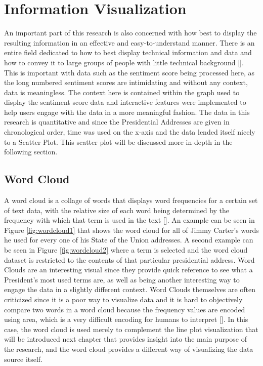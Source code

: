 \section{Information Visualization}
An important part of this research is also concerned with how best to display the resulting information in an effective and easy-to-understand manner.
There is an entire field dedicated to how to best display technical information and data and how to convey it to large groups of people with little technical background [\cite{fekete2008value}].
This is important with data such as the sentiment score being processed here, as the long numbered sentiment scores are intimidating and without any context, data is meaningless.
The context here is contained within the graph used to display the sentiment score data and interactive features were implemented to help users engage with the data in a more meaningful fashion.
The data in this research is quantitative and since the Presidential Addresses are given in chronological order, time was used on the x-axis and the data lended itself nicely to a Scatter Plot.
This scatter plot will be discussed more in-depth in the following section.


\subsection{Word Cloud}
A word cloud is a collage of words that displays word frequencies for a certain set of text data, with the relative size of each word being determined by the frequency with which that term is used in the text [\cite{heimerl2014word}].
An example can be seen in Figure \ref{fig:wordcloud1} that shows the word cloud for all of Jimmy Carter's words he used for every one of his State of the Union addresses.
A second example can be seen in Figure \ref{fig:wordcloud2} where a term is selected and the word cloud dataset is restricted to the contents of that particular presidential address.
Word Clouds are an interesting visual since they provide quick reference to see what a President's most used terms are, as well as being another interesting way to engage the data in a slightly different context.
Word Clouds themselves are often criticized since it is a poor way to visualize data and it is hard to objectively compare two words in a word cloud because the frequency values are encoded using area, which is a very difficult encoding for humans to interpret [\cite{cui2010context}].
In this case, the word cloud is used merely to complement the line plot visualization that will be introduced next chapter that provides insight into the main purpose of the research, and the word cloud provides a different way of visualizing the data source itself.

